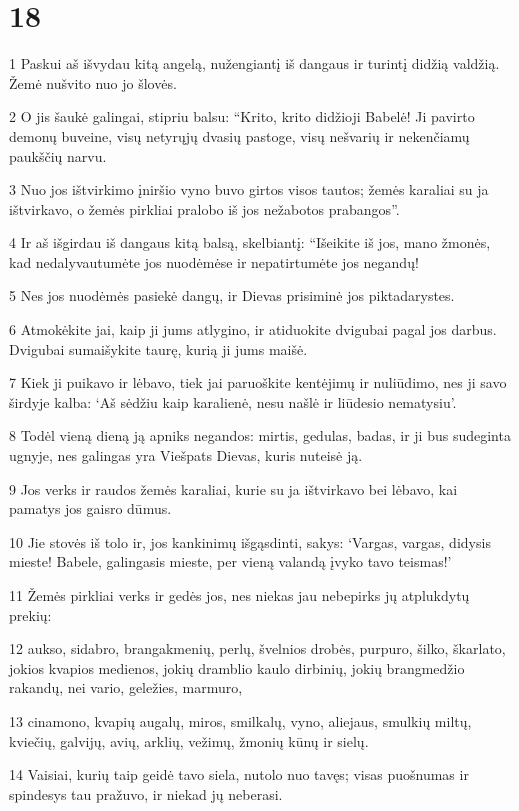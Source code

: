 \chapter{18}


\par 1 Paskui aš išvydau kitą angelą, nužengiantį iš dangaus ir turintį didžią valdžią. Žemė nušvito nuo jo šlovės. 
\par 2 O jis šaukė galingai, stipriu balsu: “Krito, krito didžioji Babelė! Ji pavirto demonų buveine, visų netyrųjų dvasių pastoge, visų nešvarių ir nekenčiamų paukščių narvu. 
\par 3 Nuo jos ištvirkimo įniršio vyno buvo girtos visos tautos; žemės karaliai su ja ištvirkavo, o žemės pirkliai pralobo iš jos nežabotos prabangos”. 
\par 4 Ir aš išgirdau iš dangaus kitą balsą, skelbiantį: “Išeikite iš jos, mano žmonės, kad nedalyvautumėte jos nuodėmėse ir nepatirtumėte jos negandų! 
\par 5 Nes jos nuodėmės pasiekė dangų, ir Dievas prisiminė jos piktadarystes. 
\par 6 Atmokėkite jai, kaip ji jums atlygino, ir atiduokite dvigubai pagal jos darbus. Dvigubai sumaišykite taurę, kurią ji jums maišė. 
\par 7 Kiek ji puikavo ir lėbavo, tiek jai paruoškite kentėjimų ir nuliūdimo, nes ji savo širdyje kalba: ‘Aš sėdžiu kaip karalienė, nesu našlė ir liūdesio nematysiu’. 
\par 8 Todėl vieną dieną ją apniks negandos: mirtis, gedulas, badas, ir ji bus sudeginta ugnyje, nes galingas yra Viešpats Dievas, kuris nuteisė ją. 
\par 9 Jos verks ir raudos žemės karaliai, kurie su ja ištvirkavo bei lėbavo, kai pamatys jos gaisro dūmus. 
\par 10 Jie stovės iš tolo ir, jos kankinimų išgąsdinti, sakys: ‘Vargas, vargas, didysis mieste! Babele, galingasis mieste, per vieną valandą įvyko tavo teismas!’ 
\par 11 Žemės pirkliai verks ir gedės jos, nes niekas jau nebepirks jų atplukdytų prekių: 
\par 12 aukso, sidabro, brangakmenių, perlų, švelnios drobės, purpuro, šilko, škarlato, jokios kvapios medienos, jokių dramblio kaulo dirbinių, jokių brangmedžio rakandų, nei vario, geležies, marmuro, 
\par 13 cinamono, kvapių augalų, miros, smilkalų, vyno, aliejaus, smulkių miltų, kviečių, galvijų, avių, arklių, vežimų, žmonių kūnų ir sielų. 
\par 14 Vaisiai, kurių taip geidė tavo siela, nutolo nuo tavęs; visas puošnumas ir spindesys tau pražuvo, ir niekad jų neberasi. 
